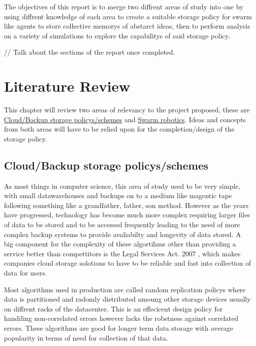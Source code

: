 \documentclass{UoYCSproject}
\begin{document}
The objectives of this report is to merge two diffrent areas of study into one by using diffrent knowledge of each area to create a suitable storage policy for swarm like agents to store collective memorys of abstarct ideas, then to perform analysis on a variety of simulations to explore the capabilitys of said storage policy. 

// Talk about the sections of the report once completed.

\chapter{Literature Review}
\label{cha:Literature Review}

This chapter will review two areas of relevancy to the project proposed, these are \hyperref[sec:Cloud]{Cloud/Backup storage policys/schemes} and \hyperref[sec:Robotics]{Swarm robotics}. Ideas and concepts from both areas will have to be relied upon for the completion/design of the storage policy. 

\section{Cloud/Backup storage policys/schemes}
\label{sec:Cloud}

As most things in computer science, this area of study used to be very simple, with small datawarehouses and backups on to a medium like magentic tape following something like a grandfather, father, son method. 
However as the years have progressed, technology has become much more complex requiring larger files of data to be stored and to be accessed frequently leading to the need of more complex backup systems to provide avaliabilty and longevity of data stored.
A big component for the complexity of these algortihms other than providing a service better than compettitors is the Legal Services Act. 2007 \cite{LSA}, which makes companies cloud storage solotions to have to be reliable and fast into collection of data for users.

Most algorithms used in production are called random replication policys \cite{Avalability storage} where data is partitioned and radomly distributed amoung other storage devices usually on diffrent racks of the datacenter.
This is an effecicent design policy for handiling non-correlated errors however lacks the robstness against correlated errors.
These algorithms are good for longer term data storage with average popularity in terms of need for collection of that data.
\end{document}
